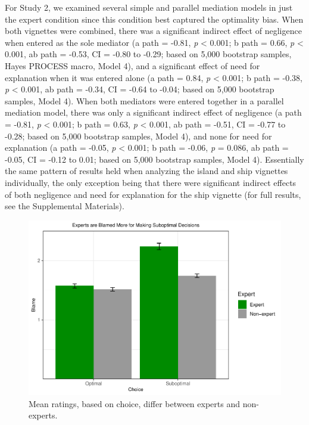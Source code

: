 \documentclass[
  man,floatsintext]{apa6}
\begin{document}
For Study 2, we examined several simple and parallel mediation models in just the expert condition since this condition best captured the optimality bias. When both vignettes were combined, there was a significant indirect effect of negligence when entered as the sole mediator (a path = -0.81, \emph{p} \textless{} 0.001; b path = 0.66, \emph{p} \textless{} 0.001, ab path = -0.53, CI = -0.80 to -0.29; based on 5,000 bootstrap samples, Hayes PROCESS macro, Model 4), and a significant effect of need for explanation when it was entered alone (a path = 0.84, \emph{p} \textless{} 0.001; b path = -0.38, \emph{p} \textless{} 0.001, ab path = -0.34, CI = -0.64 to -0.04; based on 5,000 bootstrap samples, Model 4). When both mediators were entered together in a parallel mediation model, there was only a significant indirect effect of negligence (a path = -0.81, \emph{p} \textless{} 0.001; b path = 0.63, \emph{p} \textless{} 0.001, ab path = -0.51, CI = -0.77 to -0.28; based on 5,000 bootstrap samples, Model 4), and none for need for explanation (a path = -0.05, \emph{p} \textless{} 0.001; b path = -0.06, \emph{p} = 0.086, ab path = -0.05, CI = -0.12 to 0.01; based on 5,000 bootstrap samples, Model 4). Essentially the same pattern of results held when analyzing the island and ship vignettes individually, the only exception being that there were significant indirect effects of both negligence and need for explanation for the ship vignette (for full results, see the Supplemental Materials).



\begin{figure}
\centering
\includegraphics{2-28_in-class_ScientificReportManuscriptDraft4_files/figure-latex/fig-plot-1-1.pdf}
\caption{\label{fig:fig-plot-1}Mean ratings, based on choice, differ between experts and non-experts.}
\end{figure}
\end{document}
